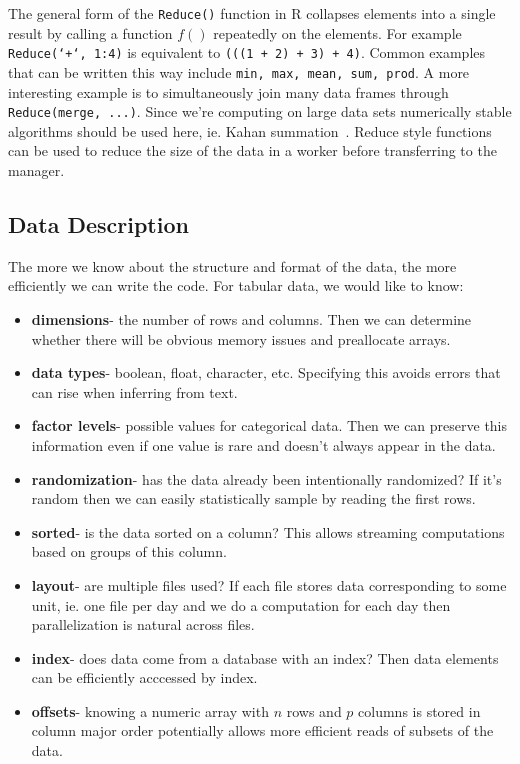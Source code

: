 \documentclass[12pt]{article}
\begin{document}
The general form of the \texttt{Reduce()} function in R collapses elements
into a single result by calling a function $f()$ repeatedly on the
elements. For example \texttt{Reduce(`+`, 1:4)} is equivalent to
\texttt{(((1 + 2) + 3) + 4)}. Common examples that can be written this way
include \texttt{min, max, mean, sum, prod}. A more interesting example is
to simultaneously join many data frames through \texttt{Reduce(merge,
...)}.  Since we're computing on large data sets numerically stable
algorithms should be used here, ie.  Kahan summation~\cite{Robey2011217}.
Reduce style functions can be used to reduce the size of the data in a
worker before transferring to the manager.

\subsection{Data Description}

The more we know about the structure and format of the data, the more
efficiently we can write the code. For tabular data, we would like to know:

\begin{itemize}
    \item \textbf{dimensions}- the number of rows and columns. Then we can determine
        whether there will be obvious memory issues and preallocate arrays.
    \item \textbf{data types}- boolean, float, character, etc. Specifying this avoids errors
        that can rise when inferring from text.
    \item \textbf{factor levels}- possible values for categorical data.
        Then we can preserve this information even if one value is rare and
        doesn't always appear in the data.
    \item \textbf{randomization}- has the data already been intentionally randomized?
        If it's random then we can easily statistically sample by reading
        the first rows.
    \item \textbf{sorted}- is the data sorted on a column? This allows
        streaming computations based on groups of this column.
    \item \textbf{layout}- are multiple files used? If each file stores
        data corresponding to some unit, ie. one file per day and we do a
        computation for each day then parallelization is natural across
        files.
    \item \textbf{index}- does data come from a database with an index?
        Then data elements can be efficiently acccessed by index.
    \item \textbf{offsets}- knowing a numeric array with $n$ rows and $p$
        columns is stored in column major order potentially allows more
        efficient reads of subsets of the data.
\end{itemize}
\end{document}

